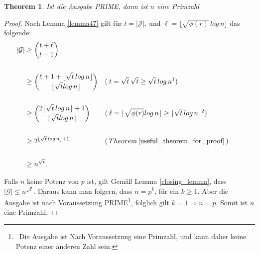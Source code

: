 \documentclass[12pt,oneside]{article}
\newtheorem{theorem}{Theorem}[section]
\theoremstyle{remark}
\theoremstyle{definition}
\begin{document}
\begin{theorem}\label{rueck_rich}
Ist die Ausgabe PRIME, dann ist $n$ eine Primzahl 
\end{theorem}

\smallskip

\begin{proof}
Nach Lemma \ref{lemma47} gilt für $t = |\mathcal{J}|$, und $\ell = \lfloor \sqrt{\phi(r)} \, log \, n \rfloor$ das folgende:\newline\newline
\begin{align*}
|\mathcal{G}| & \geq {t + \ell \choose t - 1} \\
\\
& \geq {\ell + 1 + \lfloor \sqrt{t} \, log \, n \rfloor \choose \lfloor \sqrt{t} log \, n \rfloor} && ( \: t = \sqrt{t} \,
\sqrt{t} \geq \sqrt{t} \,  log \, n\text{\footnotemark}) && \\
\\
& \geq {2 \lfloor \sqrt{t} \, log \,  n \rfloor + 1 \choose \lfloor \sqrt{t} log \, n \rfloor} && ( \: \ell = \lfloor \sqrt{\phi(r)} log \, n \rfloor \geq \lfloor \sqrt{t} \, log \, n \rfloor\text{\footnotemark})\\
\\
&\geq 2^{\lfloor \sqrt{t} \, log \, n \rfloor + 1} &&(\,  Theorem \,  \ref{useful_theorem_for_proof} \, )\\
\\
&\geq n^{\sqrt{t}}.
\end{align*}

\addtocounter{footnote}{-1}


Falls $n$ keine Potenz von $p$ ist, gilt Gemäß Lemma \ref{closing_lemma}, dass $|\mathcal{G}| \leq n^{\sqrt{t}}$. Daraus kann man folgern, dass $n = p^k$, für ein $k \geq 1$. Aber die Ausgabe ist nach Voraussetzung PRIME\footnote{ $\,$ Die Ausgabe ist Nach Voraussetzung eine Primzahl, und kann daher keine Potenz einer anderen Zahl sein.}, folglich gilt $ k= 1 \Rightarrow n = p$. Somit ist $n$ eine Primzahl.
\end{proof}
\end{document}
